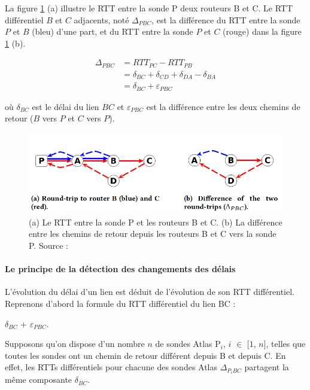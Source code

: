 La figure 	\ref{fig:rtt-differ} (a)  illustre le RTT entre la sonde P  deux routeurs B et C. Le RTT différentiel   $B$ et $C$ adjacents, noté $\Delta_{PBC}$, est la différence du RTT entre la sonde $P$ et $B$ (bleu) d'une part, et du RTT entre la sonde $P$ et $C$ (rouge) dans la figure 	\ref{fig:rtt-differ} (b). 

\begin{align*}
\Delta_{PBC} &= RTT_{PC} - RTT_{PB} \\
&= \delta_{BC} + \delta_{CD} + \delta_{DA}  - \delta_{BA} \\
&= \delta_{BC} + \varepsilon_{PBC}
\end{align*}

où $\delta_{BC}$ est le délai du lien $BC$ et $\varepsilon_{PBC}$ est la différence entre les deux chemins de retour ($B$ vers $P$ et $C$ vers $P$). 
\begin{figure}[H]
	\centering
		\captionsetup{justification= centering}
	\includegraphics[width=0.7\linewidth]{illustrations/rtt-differ}
	\caption{(a) Le RTT entre la sonde P et les routeurs B et C. (b) La différence entre les  chemins de retour depuis les routeurs B et C vers la sonde P. Source : \cite{DBLP:journals/corr/FontugneAPB16}}
	\label{fig:rtt-differ}
\end{figure}

\paragraph{Le principe de la détection des changements des délais}

L'évolution du délai d'un lien est déduit de l'évolution de son RTT différentiel. Reprenons d'abord la formule du RTT différentiel du lien BC : 

 $\delta_{BC}$ + $\varepsilon_{PBC}$. 
 
 Supposons qu'on dispose d'un nombre $n$ de sondes Atlas P$_i$, $i$ $\in$ [$1$, $n$], telles que toutes les sondes ont un chemin de retour différent depuis B et depuis C.  En effet, les RTTs différentiels pour chacune des sondes Atlas $\Delta_{P{_i}BC}$ partagent la même composante $\delta_{BC}$.

